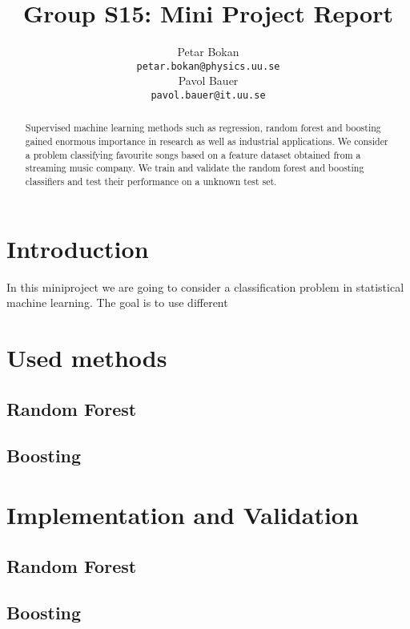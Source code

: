 \documentclass{article}
\title{Group S15: Mini Project Report}
\author{
  Petar Bokan \\
  \texttt{petar.bokan@physics.uu.se} \\
   \And
  Pavol Bauer \\
  \texttt{pavol.bauer@it.uu.se} \\
}
\begin{document}

\maketitle

\begin{abstract}
Supervised machine learning methods such as regression, random forest and boosting gained enormous importance in research as well as industrial applications.
We consider a problem classifying favourite songs based on a feature dataset obtained from a streaming music company.
We train and validate the random forest and boosting classifiers and test their performance on a unknown test set.

\end{abstract}

\section{Introduction}

In this miniproject we are going to consider a classification problem in statistical machine learning.
The goal is to use different 

\section{Used methods}

\subsection{Random Forest}

\subsection{Boosting}

\section{Implementation and Validation}

\subsection{Random Forest}

\subsection{Boosting}
\end{document}
